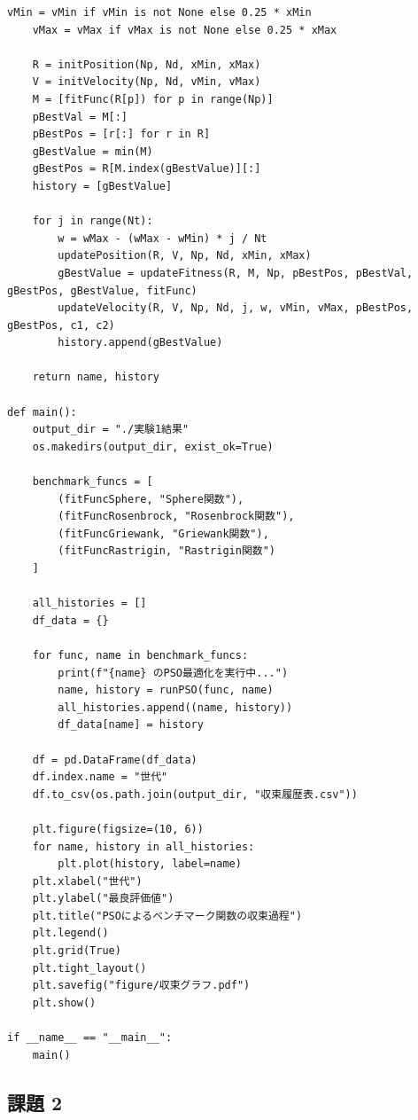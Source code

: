 \begin{lstlisting}[caption=PSOによるベンチマーク関数の最適化, label=lst:pso_code]
    vMin = vMin if vMin is not None else 0.25 * xMin
    vMax = vMax if vMax is not None else 0.25 * xMax

    R = initPosition(Np, Nd, xMin, xMax)
    V = initVelocity(Np, Nd, vMin, vMax)
    M = [fitFunc(R[p]) for p in range(Np)]
    pBestVal = M[:]
    pBestPos = [r[:] for r in R]
    gBestValue = min(M)
    gBestPos = R[M.index(gBestValue)][:]
    history = [gBestValue]

    for j in range(Nt):
        w = wMax - (wMax - wMin) * j / Nt
        updatePosition(R, V, Np, Nd, xMin, xMax)
        gBestValue = updateFitness(R, M, Np, pBestPos, pBestVal, gBestPos, gBestValue, fitFunc)
        updateVelocity(R, V, Np, Nd, j, w, vMin, vMax, pBestPos, gBestPos, c1, c2)
        history.append(gBestValue)
    
    return name, history

def main():
    output_dir = "./実験1結果"
    os.makedirs(output_dir, exist_ok=True)

    benchmark_funcs = [
        (fitFuncSphere, "Sphere関数"),
        (fitFuncRosenbrock, "Rosenbrock関数"),
        (fitFuncGriewank, "Griewank関数"),
        (fitFuncRastrigin, "Rastrigin関数")
    ]

    all_histories = []
    df_data = {}

    for func, name in benchmark_funcs:
        print(f"{name} のPSO最適化を実行中...")
        name, history = runPSO(func, name)
        all_histories.append((name, history))
        df_data[name] = history

    df = pd.DataFrame(df_data)
    df.index.name = "世代"
    df.to_csv(os.path.join(output_dir, "収束履歴表.csv"))

    plt.figure(figsize=(10, 6))
    for name, history in all_histories:
        plt.plot(history, label=name)
    plt.xlabel("世代")
    plt.ylabel("最良評価値")
    plt.title("PSOによるベンチマーク関数の収束過程")
    plt.legend()
    plt.grid(True)
    plt.tight_layout()
    plt.savefig("figure/収束グラフ.pdf")
    plt.show()

if __name__ == "__main__":
    main()
\end{lstlisting}

\subsection{課題 2}

